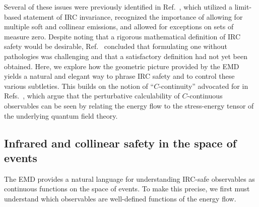\documentclass[letterpaper,11pt]{article}
\DeclareRobustCommand{\Ref}[1]{Ref.~\cite{#1}}
\DeclareRobustCommand{\Refs}[1]{Refs.~\cite{#1}}
\begin{document}
Several of these issues were previously identified in \Ref{Banfi:2004yd}, which utilized a limit-based statement of IRC invariance, recognized the importance of allowing for multiple soft and collinear emissions, and allowed for exceptions on sets of measure zero.
%
Despite noting that a rigorous mathematical definition of IRC safety would be desirable, \Ref{Banfi:2004yd} concluded that formulating one without pathologies was challenging and that a satisfactory definition had not yet been obtained.
%
Here, we explore how the geometric picture provided by the EMD yields a natural and elegant way to phrase IRC safety and to control these various subtleties.
%
This builds on the notion of ``$C$-continuity'' advocated for in \Refs{Tkachov:1995kk,Tkachov:1999py}, which argue that the perturbative calculability of $C$-continuous observables can be seen by relating the energy flow to the stress-energy tensor of the underlying quantum field theory.


\subsection{Infrared and collinear safety in the space of events}
\label{sec:ircsafety}


The EMD provides a natural language for understanding IRC-safe observables as continuous functions on the space of events.
%
To make this precise, we first must understand which observables are well-defined functions of the energy flow.
\end{document}
